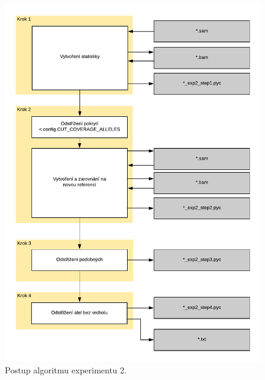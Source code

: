 \documentclass[czech,DP]{thesiskiv}
\numberwithin{equation}{section}
\begin{document}
\begin{figure}[H]
		\centering
		\includegraphics[width=\textwidth]{./img/exp2_diagram.pdf}
		\caption{Postup algoritmu experimentu 2. }
		\label{fig:exp2_diagram}
\end{figure}
\end{document}
